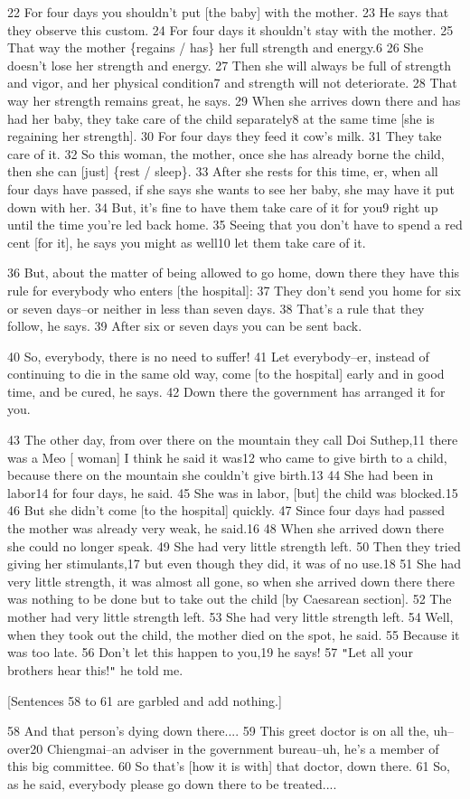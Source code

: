 22 For four days you shouldn't put [the baby] with the mother. 23 He says that
they observe this custom. 24 For four days it shouldn't stay with the mother. 25
That way the mother \{regains / has\} her full strength and energy.6 26 She doesn't
lose her strength and energy. 27 Then she will always be full of strength and vigor,
and her physical condition7 and strength will not deteriorate. 28 That way her
strength remains great, he says. 29 When she arrives down there and has had her
baby, they take care of the child separately8 at the same time [she is regaining
her strength]. 30 For four days they feed it cow's milk. 31 They take care of it.
32 So this woman, the mother, once she has already borne the child, then she can
[just] \{rest / sleep\}. 33 After she rests for this time, er, when all four days
have passed, if she says she wants to see her baby, she may have it put down with
her. 34 But, it's fine to have them take care of it for you9 right up until the
time you're led back home. 35 Seeing that you don't have to spend a red cent [for
it], he says you might as well10 let them take care of it.

36 But, about the matter of being allowed to go home, down there they have this
rule for everybody who enters [the hospital]: 37 They don't send you home for six
or seven days--or neither in less than seven days. 38 That's a rule that they follow,
he says. 39 After six or seven days you can be sent back.

40 So, everybody, there is no need to suffer! 41 Let everybody--er, instead of
continuing to die in the same old way, come [to the hospital] early and in good
time, and be cured, he says. 42 Down there the government has arranged it for you.

43 The other day, from over there on the mountain they call Doi Suthep,11 there
was a Meo [ woman] I think he said it was12 who came to give birth to a child,
because there on the mountain she couldn't give birth.13 44 She had been in labor14
for four days, he said. 45 She was in labor, [but] the child was blocked.15 46
But she didn't come [to the hospital] quickly. 47 Since four days had passed the
mother was already very weak, he said.16 48 When she arrived down there she could
no longer speak. 49 She had very little strength left. 50 Then they tried giving
her stimulants,17 but even though they did, it was of no use.18 51 She had very
little strength, it was almost all gone, so when she arrived down there there was
nothing to be done but to take out the child [by Caesarean section]. 52 The mother
had very little strength left. 53 She had very little strength left. 54 Well, when
they took out the child, the mother died on the spot, he said. 55 Because it was
too late. 56 Don't let this happen to you,19 he says! 57 \texttt{"}Let all your
brothers hear this!\texttt{"} he told me.

[Sentences 58 to 61 are garbled and add nothing.]

58 And that person's dying down there.... 59 This greet doctor is on all the, uh--over20
Chiengmai--an adviser in the government bureau--uh, he's a member of this big committee.
60 So that's [how it is with] that doctor, down there. 61 So, as he said, everybody
please go down there to be treated....


